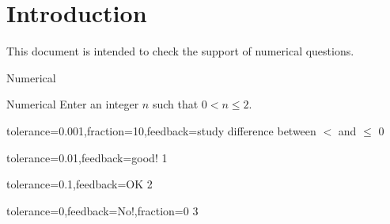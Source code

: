 \documentclass{article}
\begin{document}
\section*{Introduction}

This document is intended to check the support of numerical questions.

\begin{quiz}{Numerical}

\begin{numerical}{Numerical}
Enter an integer $n$ such that $0< n\leq 2$.
\item[tolerance=0.001,fraction={10},feedback={study difference between $<$ and 
$\leq$}] 0
\item[tolerance=0.01,feedback={good!}] 1
\item[tolerance=0.1,feedback={OK}] 2
\item[tolerance=0,feedback={No!},fraction=0] 3
\end{numerical}

\end{quiz}
\end{document}
